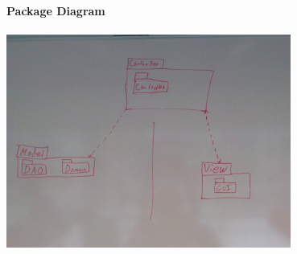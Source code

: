 \documentclass[a4paper,10pt,titlepage]{article}
\begin{document}
\textbf{Package Diagram}
\\ \\
\includegraphics[width=0.7\textwidth]{./umlpackagediagram}\\[1cm] 
	
	
	
	
\end{document}
